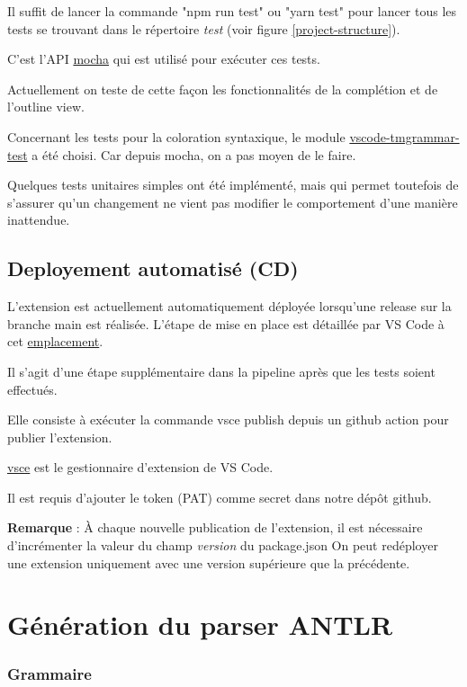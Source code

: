 \documentclass[
    iict, %
    il, %
]{heig-tb}
\begin{document}
Il suffit de lancer la commande "npm run test" ou "yarn test" pour lancer tous les tests se trouvant dans le répertoire \emph{test} (voir figure \ref{project-structure}).

C'est l'API \href{https://mochajs.org/api/}{mocha} qui est utilisé pour exécuter ces tests.

Actuellement on teste de cette façon les fonctionnalités de la complétion et de l'outline view.

Concernant les tests pour la coloration syntaxique, le module \href{https://www.npmjs.com/package/vscode-tmgrammar-test?activeTab}{vscode-tmgrammar-test} a été choisi.
Car depuis mocha, on a pas moyen de le faire.

Quelques tests unitaires simples ont été implémenté, mais qui permet toutefois de s'assurer qu'un changement ne vient pas modifier le comportement d'une manière inattendue.

\subsection{Deployement automatisé (CD)}

L'extension est actuellement automatiquement déployée lorsqu'une release sur la branche main est réalisée.
L'étape de mise en place est détaillée par VS Code à cet \href{https://code.visualstudio.com/api/working-with-extensions/continuous-integration#github-actions}{emplacement}.

Il s'agit d'une étape supplémentaire dans la pipeline après que les tests soient effectués.

Elle consiste à exécuter la commande vsce publish depuis un github action pour publier l'extension.

\href{https://www.npmjs.com/package/vsce}{vsce} est le gestionnaire d'extension de VS Code.

Il est requis d'ajouter le token (PAT) comme secret dans notre dépôt github.

\textbf{Remarque } :
À chaque nouvelle publication de l'extension, il est nécessaire d'incrémenter la valeur du champ \emph{version} du package.json
On peut redéployer une extension uniquement avec une version supérieure que la précédente.

\section{Génération du parser ANTLR}
\subsubsection{Grammaire}
\end{document}
